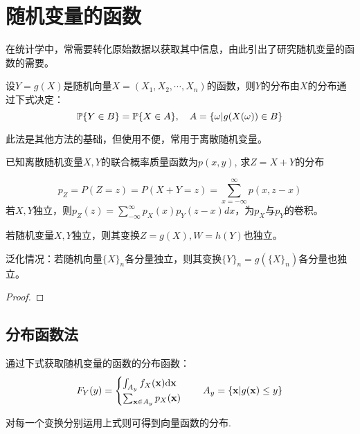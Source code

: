 \section{随机变量的函数}

在统计学中，常需要转化原始数据以获取其中信息，由此引出了研究随机变量的函数的需要。

\begin{theorem}[随机变量的函数的分布]
    设$Y=g(X)$是随机向量$X=(X_1,X_2,\cdots ,X_n)$的函数，则$Y$的分布由$X$的分布通过下式决定：
    \[ \P\{Y \in B\} = \P\{X \in A\}, \quad A=\{ \omega |g(X(\omega))\in B\} \]
\end{theorem}

此法是其他方法的基础，但使用不便，常用于离散随机变量。

\begin{example}[离散卷积公式]\label{exp:sum_of_pmf}
    已知离散随机变量$X,Y$的联合概率质量函数为$p(x,y)$, 求$Z=X+Y$的分布
\end{example}
\begin{solution}
    \[ p_Z=P(Z=z)=P(X+Y=z)=\sum_{x=-\infty}^{\infty}p(x, z-x) \]
    若$X,Y$独立，则$p_Z(z)=\sum_{-\infty}^{\infty}p_X(x)p_Y(z-x)dx$，为$p_X$与$p_Y$的卷积。
\end{solution}

\begin{theorem}[]
    若随机变量$X,Y$独立，则其变换$Z=g(X), W=h(Y)$也独立。

    泛化情况：若随机向量$\{X\}_n$各分量独立，则其变换$\{Y\}_n=g(\{X\}_n)$各分量也独立。
\end{theorem}
\begin{proof}
\end{proof}

\subsection{分布函数法}

通过下式获取随机变量的函数的分布函数：
\[ F_Y(y)=\begin{cases}
        \int_{A_y}f_X(\mathbf{x})\d\mathbf{x} \\
        \sum_{\mathbf{x} \in A_y}p_X(\mathbf{x})
    \end{cases}   \quad A_y=\{ \mathbf{x}|g(\mathbf{x}) \le y \} \]

对每一个变换分别运用上式则可得到向量函数的分布.

